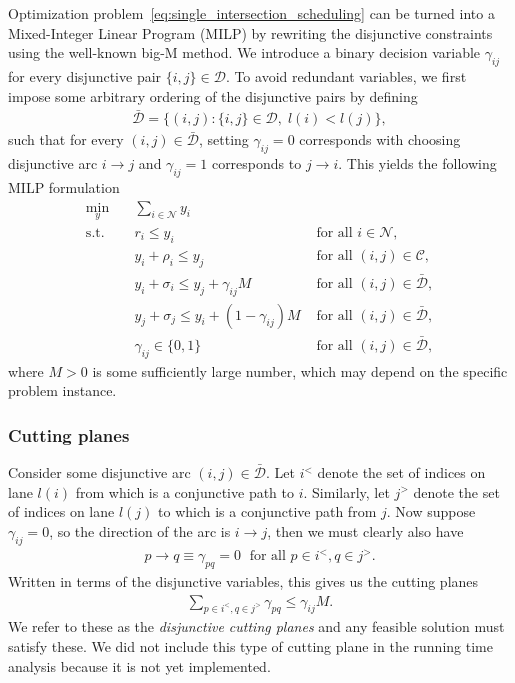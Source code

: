 \documentclass[a4paper]{article}
\theoremstyle{definition}
\theoremstyle{plain}
\begin{document}
Optimization problem~\ref{eq:single_intersection_scheduling} can be turned into
a Mixed-Integer Linear Program (MILP) by rewriting the disjunctive constraints using
the well-known big-M method.
%
We introduce a binary decision variable $\gamma_{ij}$ for every
disjunctive pair $\{i, j\} \in \mathcal{D}$.
%
To avoid redundant variables, we first impose some arbitrary ordering of the
disjunctive pairs by defining
\begin{align*}
  \bar{\mathcal{D}} = \{ (i,j) : \{i,j\} \in \mathcal{D}, \; l(i) < l(j) \} ,
\end{align*}
such that for every $(i,j) \in \bar{\mathcal{D}}$, setting $\gamma_{ij} = 0$
corresponds with choosing disjunctive arc $i \rightarrow j$ and
$\gamma_{ij} = 1$ corresponds to $j \rightarrow i$. This yields the following
MILP formulation
%
\begin{align*}
  \min_{y} \quad & \sum_{i \in \mathcal{N}} y_{i} & \\
  \text{s.t.} \quad & r_{i} \leq y_{i} & \text{ for all } i \in \mathcal{N} , \\
  & y_{i} + \rho_{i} \leq y_{j} & \text{ for all } (i,j) \in \mathcal{C} , \label{eq:conjunctions} \\
  & y_{i} + \sigma_{i} \leq y_{j} + \gamma_{ij}M & \text{ for all } (i,j) \in \bar{\mathcal{D}} , \\
  & y_{j} + \sigma_{j} \leq y_{i} + (1 - \gamma_{ij})M & \text{ for all } (i,j) \in \bar{\mathcal{D}} , \\
  & \gamma_{ij} \in \{0, 1\} & \text{ for all } (i,j) \in \bar{\mathcal{D}} ,
\end{align*}
where $M > 0$ is some sufficiently large number, which may depend on the
specific problem instance.

\subsubsection*{Cutting planes}

Consider some disjunctive arc $(i,j) \in \bar{\mathcal{D}}$. Let $i^{<}$ denote
the set of indices on lane $l(i)$ from which is a conjunctive path to $i$.
Similarly, let $j^{>}$ denote the set of indices on lane $l(j)$ to which is a
conjunctive path from $j$.
%
Now suppose $\gamma_{ij} = 0$, so the direction of the arc is $i \rightarrow j$,
then we must clearly also have
\begin{align*}
  p \rightarrow q \equiv \gamma_{pq} = 0 \; \text{ for all } p \in i^{<}, q \in j^{>} .
\end{align*}
Written in terms of the disjunctive variables, this gives us the cutting planes
\begin{align*}
  \sum_{p \in i^{<}, q \in j^{>}} \gamma_{pq} \leq \gamma_{ij} M .
\end{align*}
We refer to these as the \textit{disjunctive cutting planes} and any feasible solution
must satisfy these. {\color{blue} We did not include this type of cutting
  plane in the running time analysis because it is not yet implemented.}
\end{document}
